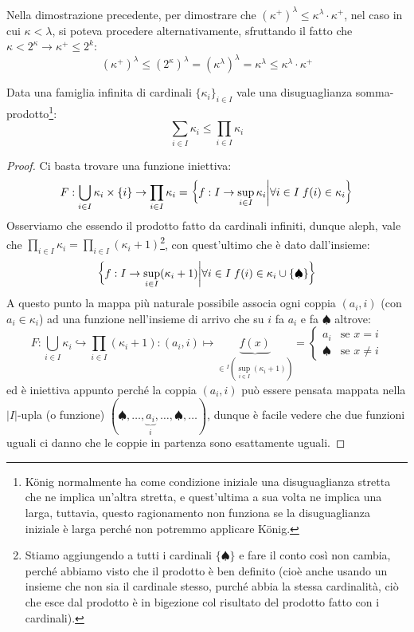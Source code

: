 \begin{remark}
	Nella dimostrazione precedente, per dimostrare che $(\kappa^+)^\lambda \leq \kappa^\lambda \cdot \kappa^+$, nel caso in cui $\kappa < \lambda$, si poteva procedere alternativamente, sfruttando il fatto che $\kappa < 2^\kappa \to \kappa^+ \leq 2^k$:
	\[ (\kappa^+)^\lambda \leq (2^{\kappa})^{\lambda} = (\kappa^{\lambda})^{\lambda} = \kappa^\lambda \leq \kappa^\lambda \cdot \kappa^+
		\]	
\end{remark}

\pagebreak

\begin{remark}
	Data una famiglia infinita di cardinali $\{\kappa_i\}_{i \in I}$ vale una disuguaglianza somma-prodotto\footnote{König normalmente ha come condizione iniziale una disuguaglianza
	stretta che ne implica un'altra stretta, e quest'ultima a sua volta ne implica una larga, tuttavia, questo ragionamento non funziona se la disuguaglianza iniziale è larga perché non potremmo applicare König.}:
	\[ \sum_{i \in I} \kappa_i \leq \prod_{i \in I} \kappa_i
		\]
\end{remark}

\begin{proof}
	Ci basta trovare una funzione iniettiva:
	\[  F : \bigcup_{i \in I} \kappa_i \times \{i\} \to \prod_{i \in I}\kappa_i = \left\{f : I \to \sup_{i \in I}\kappa_i \middle| \forall i \in I \; f(i) \in \kappa_i\right\}
		\]
	Osserviamo che essendo il prodotto fatto da cardinali infiniti, dunque aleph, vale che $\prod_{i \in I} \kappa_i = \prod_{i \in I} (\kappa_i + 1)$\footnote{Stiamo aggiungendo a tutti i cardinali $\{\spadesuit\}$ e fare il conto così non cambia, perché abbiamo visto che il prodotto è ben definito (cioè anche usando un insieme che non sia il cardinale stesso, purché abbia la stessa cardinalità, ciò che esce dal prodotto è in bigezione col risultato del prodotto fatto con i cardinali).}, con quest'ultimo che è dato dall'insieme:
	\[ \left\{f : I \to \sup_{i \in I}(\kappa_i + 1) \middle| \forall i \in I \; f(i) \in \kappa_i \cup \{\spadesuit\}\right\}
		\]
	A questo punto la mappa più naturale possibile associa ogni coppia $(a_i,i)$ (con $a_i \in \kappa_i$) ad una funzione nell'insieme di arrivo che su $i$ fa $a_i$ e fa $\spadesuit$ altrove:
	\[ F : \bigcup_{i \in I} \kappa_i \hookrightarrow \prod_{i \in I} (\kappa_i + 1) : (a_i,i) \mapsto \underbrace{f(x)}_{\in {}^I(\sup_{i \in I}(\kappa_i + 1))} = \begin{cases}
		a_i &\text{se $x = i$} \\
		\spadesuit &\text{se $x \ne i$}
	\end{cases}
		\]
	ed è iniettiva appunto perché la coppia $(a_i,i)$ può essere pensata mappata nella $|I|$-upla (o funzione) $(\spadesuit,\ldots,\underbrace{a_i}_{i},\ldots,\spadesuit,\ldots)$, dunque è facile vedere che due funzioni uguali ci danno che le coppie in partenza sono esattamente uguali.
\end{proof}

